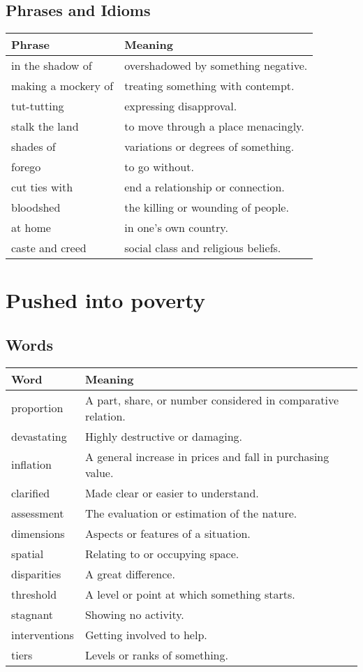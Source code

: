 \documentclass{article}%
\begin{document}
\subsection{Phrases and Idioms}%
\label{subsec:PhrasesandIdioms}%
\begin{tabular}{ll}%
Phrase&Meaning\\%
\hline%
in the shadow of&overshadowed by something negative.\\%
making a mockery of&treating something with contempt.\\%
tut{-}tutting&expressing disapproval.\\%
stalk the land&to move through a place menacingly.\\%
shades of&variations or degrees of something.\\%
forego&to go without.\\%
cut ties with&end a relationship or connection.\\%
bloodshed&the killing or wounding of people.\\%
at home&in one's own country.\\%
caste and creed&social class and religious beliefs.\\%
\end{tabular}

%
\section{Pushed into poverty}%
\label{sec:Pushedintopoverty}%
\subsection{Words}%
\label{subsec:Words}%
\begin{tabular}{ll}%
Word&Meaning\\%
\hline%
proportion&A part, share, or number considered in comparative relation.\\%
devastating&Highly destructive or damaging.\\%
inflation&A general increase in prices and fall in purchasing value.\\%
clarified&Made clear or easier to understand.\\%
assessment&The evaluation or estimation of the nature.\\%
dimensions&Aspects or features of a situation.\\%
spatial&Relating to or occupying space.\\%
disparities&A great difference.\\%
threshold&A level or point at which something starts.\\%
stagnant&Showing no activity.\\%
interventions&Getting involved to help.\\%
tiers&Levels or ranks of something.\\%
\end{tabular}
\end{document}

